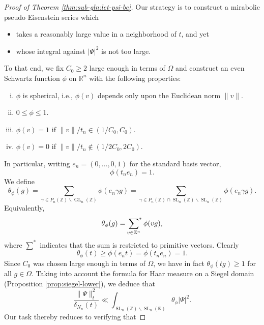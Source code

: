 \documentclass[reqno]{amsart}
\DeclareMathOperator{\SL}{SL}
\DeclareMathOperator{\GL}{GL}
\theoremstyle{plain} \newtheorem{theorem} {Theorem}
\theoremstyle{definition} \newtheorem{definition} [theorem] {Definition}
\theoremstyle{itplain} %
\numberwithin{equation}{section}
\numberwithin{theorem}{section}
\renewcommand{\geq}{\geqslant}
\renewcommand{\leq}{\leqslant}
\begin{document}
\begin{proof}[Proof of Theorem \ref{thm:sub-gln:let-psi-be}]
  Our strategy is to construct a mirabolic pseudo Eisenstein series which
  \begin{itemize}
  \item takes a reasonably large value in a neighborhood of $t$, and yet
  \item whose integral against $|\Psi|^2$ is not too large.
  \end{itemize}
  To that end, we fix $C_0 \geq 2$ large enough in terms of $\Omega$ and construct an even Schwartz function $\phi$ on $\mathbb{R}^n$ with the following properties:
\begin{enumerate}[(i)]
\item $\phi$ is spherical, i.e., $\phi(v)$ depends only upon the Euclidean norm $\|v\|$.
\item $0 \leq \phi \leq 1$.
\item $\phi(v) = 1$ if $\|v\| / t_n \in (1/C_0, C_0)$.
\item $\phi(v) = 0$ if $\|v\| / t_n \notin (1/2 C_0, 2 C_0)$.
\end{enumerate}
In particular, writing $e_n = (0,\dotsc,0,1)$ for the standard basis vector,
\begin{equation}
  \phi(t_n e_n) = 1.
\end{equation}
We define
\begin{equation*}
  \theta_\phi(g) = \sum_{\gamma \in P_n(\mathbb{Z}) \backslash \GL_n(\mathbb{Z})} \phi(e_n \gamma g)
  =
  \sum_{\gamma \in P_n(\mathbb{Z}) \cap \SL_n(\mathbb{Z}) \backslash \SL_n(\mathbb{Z})} \phi(e_n \gamma g).
\end{equation*}
Equivalently,
\begin{equation*}
  \theta_\phi(g) = \sideset{}{^*}\sum _{v \in \mathbb{Z}^n}\phi(v g),
\end{equation*}
where $\sum^*$ indicates that the sum is restricted to primitive vectors.  Clearly
\begin{equation*}
  \theta_\phi(t) \geq \phi(e_n t) = \phi(t_n e_n) = 1.
\end{equation*}
Since $C_0$ was chosen large enough in terms of $\Omega$, we have in fact $\theta_\phi(t g) \geq 1$ for all $g \in \Omega$.  Taking into account the formula for Haar measure on a Siegel domain (Proposition \ref{prop:siegel-lower}), we deduce that
\begin{equation*}
  \frac{\|\Psi \|_t^2 }{\delta_{N_n}(t)} \ll
  \int _{\SL_n(\mathbb{Z}) \backslash \SL_n(\mathbb{R})} \theta_\phi |\Psi|^2.
\end{equation*}
Our task thereby reduces to verifying that

\end{proof}
\end{document}
